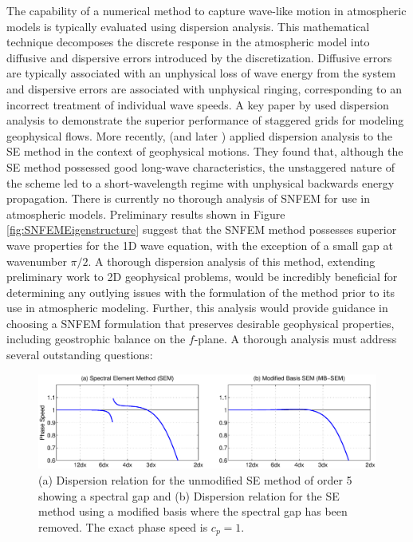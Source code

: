\documentclass[11pt]{article}
\begin{document}
The capability of a numerical method to capture wave-like motion in atmospheric models is typically evaluated using dispersion analysis.  This mathematical technique decomposes the discrete response in the atmospheric model into diffusive and dispersive errors introduced by the discretization.  Diffusive errors are typically associated with an unphysical loss of wave energy from the system and dispersive errors are associated with unphysical ringing, corresponding to an incorrect treatment of individual wave speeds.  A key paper by \cite{DAR1994MWR} used dispersion analysis to demonstrate the superior performance of staggered grids for modeling geophysical flows.  More recently, \cite{MAHAW2009SIAMJNA} (and later \cite{TMASJT2012QJRMS}) applied dispersion analysis to the SE method in the context of geophysical motions.  They found that, although the SE method possessed good long-wave characteristics, the unstaggered nature of the scheme led to a short-wavelength regime with unphysical backwards energy propagation.  There is currently no thorough analysis of SNFEM for use in atmospheric models.  Preliminary results shown in Figure \ref{fig:SNFEMEigenstructure} suggest that the SNFEM method possesses superior wave properties for the 1D wave equation, with the exception of a small gap at wavenumber $\pi / 2$.  A thorough dispersion analysis of this method, extending preliminary work to 2D geophysical problems, would be incredibly beneficial for determining any outlying issues with the formulation of the method prior to its use in atmospheric modeling.  Further, this analysis would provide guidance in choosing a SNFEM formulation that preserves desirable geophysical properties, including geostrophic balance on the $f$-plane.  A thorough analysis must address several outstanding questions:

\begin{figure}
\begin{center}
\includegraphics[width=6.5in]{ModifiedBasisMethod}
\end{center}
\caption{(a) Dispersion relation for the unmodified SE method of order 5 showing a spectral gap and (b) Dispersion relation for the SE method using a modified basis where the spectral gap has been removed.  The exact phase speed is $c_p = 1$.} \label{fig:SEMDispersionGap}
\end{figure}
\end{document}
